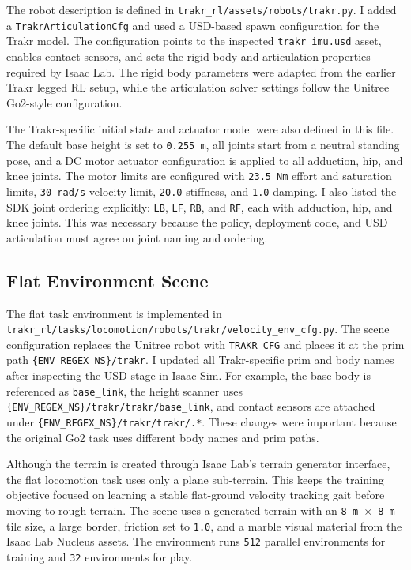 The robot description is defined in \texttt{trakr\_rl/assets/robots/trakr.py}. I added a
\texttt{TrakrArticulationCfg} and used a USD-based spawn configuration for the Trakr model. The
configuration points to the inspected \texttt{trakr\_imu.usd} asset, enables contact sensors, and sets the
rigid body and articulation properties required by Isaac Lab. The rigid body parameters were adapted from
the earlier Trakr legged RL setup, while the articulation solver settings follow the Unitree Go2-style
configuration.

The Trakr-specific initial state and actuator model were also defined in this file. The default base
height is set to \texttt{0.255 m}, all joints start from a neutral standing pose, and a DC motor actuator
configuration is applied to all adduction, hip, and knee joints. The motor limits are configured with
\texttt{23.5 Nm} effort and saturation limits, \texttt{30 rad/s} velocity limit, \texttt{20.0} stiffness,
and \texttt{1.0} damping. I also listed the SDK joint ordering explicitly:
\texttt{LB}, \texttt{LF}, \texttt{RB}, and \texttt{RF}, each with adduction, hip, and knee joints. This
was necessary because the policy, deployment code, and USD articulation must agree on joint naming and
ordering.

\subsection{Flat Environment Scene}

The flat task environment is implemented in
\texttt{trakr\_rl/tasks/locomotion/robots/trakr/velocity\_env\_cfg.py}. The scene configuration replaces
the Unitree robot with \texttt{TRAKR\_CFG} and places it at the prim path
\texttt{\{ENV\_REGEX\_NS\}/trakr}. I updated all Trakr-specific prim and body names after inspecting the
USD stage in Isaac Sim. For example, the base body is referenced as \texttt{base\_link}, the height scanner
uses \texttt{\{ENV\_REGEX\_NS\}/trakr/trakr/base\_link}, and contact sensors are attached under
\texttt{\{ENV\_REGEX\_NS\}/trakr/trakr/.*}. These changes were important because the original Go2 task
uses different body names and prim paths.

Although the terrain is created through Isaac Lab's terrain generator interface, the flat locomotion task
uses only a plane sub-terrain. This keeps the training objective focused on learning a stable flat-ground
velocity tracking gait before moving to rough terrain. The scene uses a generated terrain with an
\texttt{8 m \(\times\) 8 m} tile size, a large border, friction set to \texttt{1.0}, and a marble visual
material from the Isaac Lab Nucleus assets. The environment runs \texttt{512} parallel environments for
training and \texttt{32} environments for play.

